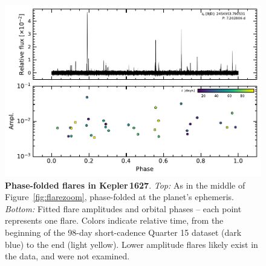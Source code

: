 \documentclass[12pt,modern,twocolumn,tighten]{aastex63}
\begin{document}
\begin{figure}[t]
	\begin{center}
		\leavevmode
		\includegraphics[width=1.0\textwidth]{f8.pdf}
	\end{center}
	\vspace{-0.7cm}
	\caption{
		{\bf Phase-folded flares in Kepler\,1627}.  
    {\it Top:}
    As in the middle of Figure~\ref{fig:flarezoom}, phase-folded at
    the planet's ephemeris.
    {\it Bottom:}
    Fitted flare amplitudes and orbital phases -- each point
    represents one flare.
    Colors indicate relative time, from the beginning of the
    98-day short-cadence Quarter 15 dataset (dark blue) to the end (light
    yellow).
    Lower amplitude flares likely exist in the data, and were not
    examined.
		\label{fig:flarephase}
	}
\end{figure}
\end{document}
